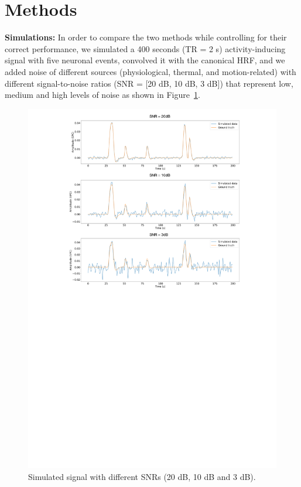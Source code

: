\section{Methods}
\label{sec:data}

\textbf{Simulations:} In order to compare the two methods while controlling for their correct performance, we simulated a 400 seconds (TR = 2 s) activity-inducing signal with five neuronal events, convolved it with the canonical HRF, and we added noise of different sources (physiological, thermal, and motion-related) with different signal-to-noise ratios (SNR = [20 dB, 10 dB, 3 dB]) that represent low, medium and high levels of noise as shown in Figure~\ref{fig:simulations}.

\begin{figure}[h]
    \begin{center}
        \includegraphics[width=\columnwidth]{figures/sim.pdf}
    \end{center}
    \caption{Simulated signal with different SNRs (20 dB, 10 dB and 3 dB).}
\label{fig:simulations}
\end{figure}

